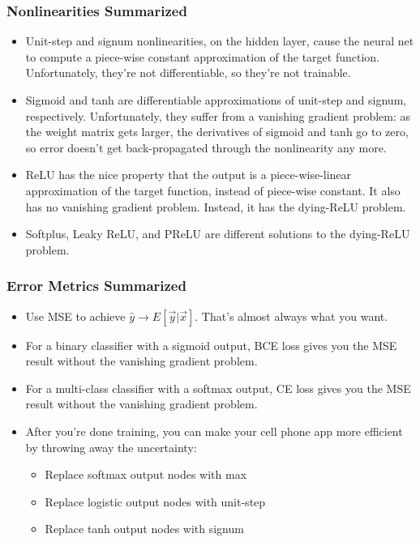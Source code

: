 \documentclass{beamer}
\begin{document}
\begin{frame}
  \frametitle{Nonlinearities Summarized}
  \begin{itemize}
  \item Unit-step and signum nonlinearities, on the hidden layer,
    cause the neural net to compute a piece-wise constant approximation
    of the target function. Unfortunately, they're not differentiable, so they're not
    trainable.
  \item Sigmoid and tanh are differentiable approximations of
    unit-step and signum, respectively.  Unfortunately, they suffer
    from a vanishing gradient problem: as the weight matrix gets
    larger, the derivatives of sigmoid and tanh go to zero, so error
    doesn't get back-propagated through the nonlinearity any more.
  \item ReLU has the nice property that the output is a
    piece-wise-linear approximation of the target function, instead of
    piece-wise constant.  It also has no vanishing gradient problem.
    Instead, it has the dying-ReLU problem.
  \item Softplus, Leaky ReLU, and PReLU are different solutions to the
    dying-ReLU problem.
  \end{itemize}
\end{frame}

\begin{frame}
  \frametitle{Error Metrics Summarized}
  \begin{itemize}
    \item Use MSE to achieve $\hat{y}\rightarrow
      E\left[\vec{y}|\vec{x}\right]$.  That's almost always what you
      want.
    \item For a binary classifier with a sigmoid output, BCE loss gives you
      the MSE result without the vanishing gradient problem.
    \item For a multi-class classifier with a softmax output, CE loss gives you
      the MSE result without the vanishing gradient problem.
    \item After you're done training, you can make your cell phone app
      more efficient by throwing away the uncertainty:
      \begin{itemize}
      \item Replace softmax output nodes with max
      \item Replace logistic output nodes with unit-step
      \item Replace tanh output nodes with signum
      \end{itemize}
  \end{itemize}
\end{frame}
\end{document}
